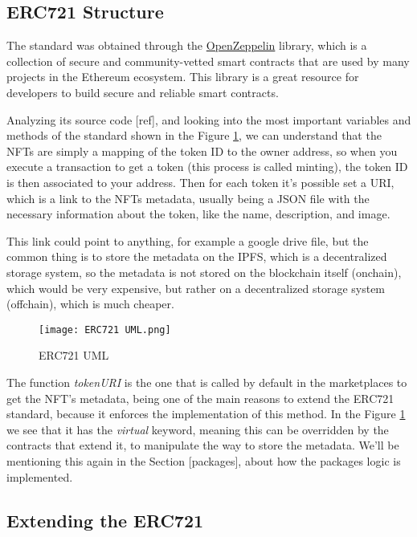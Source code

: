 \subsection{ERC721 Structure}
\label{subsec:erc721_structure}

The standard was obtained through the \href{https://docs.openzeppelin.com/contracts/api/token/erc721#ERC721}{OpenZeppelin} library, which is a collection of secure and community-vetted smart contracts that are used by many projects in the Ethereum ecosystem. This library is a great resource for developers to build secure and reliable smart contracts.

Analyzing its source code [ref], and looking into the most important variables and methods of the standard shown in the Figure \ref{fig:erc721_uml}, we can understand that the NFTs are simply a mapping of the token ID to the owner address, so when you execute a transaction to get a token (this process is called minting), the token ID is then associated to your address. Then for each token it's possible set a URI, which is a link to the NFTs metadata, usually being a JSON file with the necessary information about the token, like the name, description, and image.

This link could point to anything, for example a google drive file, but the common thing is to store the metadata on the IPFS, which is a decentralized storage system, so the metadata is not stored on the blockchain itself (onchain), which would be very expensive, but rather on a decentralized storage system (offchain), which is much cheaper.

\begin{figure}[H]
    \texttt{[image: ERC721 UML.png]}
    \centering
    \caption{ERC721 UML}
    \label{fig:erc721_uml}
\end{figure}

The function \textit{tokenURI} is the one that is called by default in the marketplaces to get the NFT's metadata, being one of the main reasons to extend the ERC721 standard, because it enforces the implementation of this method. In the Figure \ref{fig:erc721_uml} we see that it has the \textit{virtual} keyword, meaning this can be overridden by the contracts that extend it, to manipulate the way to store the metadata. We'll be mentioning this again in the Section [packages], about how the packages logic is implemented.

\subsection{Extending the ERC721}

